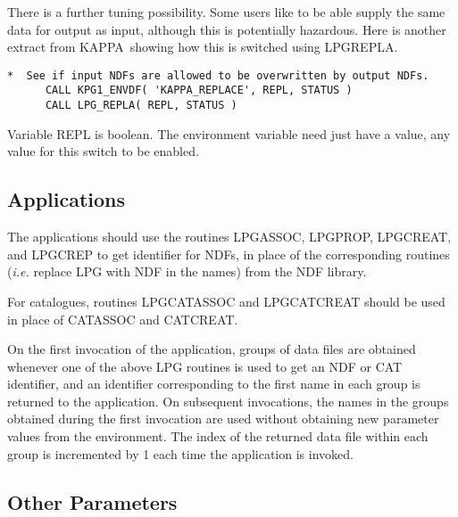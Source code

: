 \documentclass[twoside,11pt]{article}
\newcommand{\htmlref}[2]{#1}
\newcommand{\latex}[1]{#1}
\newcommand{\xref}[3]{#1}
\renewcommand{\_}{\texttt{\symbol{95}}}
\newcommand{\KAPPA}{{\footnotesize KAPPA}\normalsize}
\begin{document}
There is a further tuning possibility.  Some users like to be able
supply the same data for output as input, although this is potentially
hazardous.  Here is another extract from \KAPPA\ showing how this
is switched using \htmlref{LPG\_REPLA}{LPG_REPLA}.

\small
\begin{verbatim}
*  See if input NDFs are allowed to be overwritten by output NDFs.
      CALL KPG1_ENVDF( 'KAPPA_REPLACE', REPL, STATUS )
      CALL LPG_REPLA( REPL, STATUS )
\end{verbatim}
\normalsize
Variable REPL is boolean.  The environment variable need just have a
value, any value for this switch to be enabled.


\subsection{Applications}

The applications should use the routines \htmlref{LPG\_ASSOC}{LPG_ASSOC},
\htmlref{LPG\_PROP}{LPG_PROP}, \htmlref{LPG\_CREAT}{LPG\_CREAT},
and \latex{\linebreak}\htmlref{LPG\_CREP}{LPG_CREP} to get identifier for NDFs, in
place of the corresponding routines (\emph{i.e.} replace LPG with NDF in
the names) from the \xref{NDF library}{sun33}{}.

For catalogues, routines \htmlref{LPG\_CATASSOC}{LPG_CATASSOC} and
\htmlref{LPG\_CATCREAT}{LPG_CATCREAT} should be
used in place of \xref{CAT\_ASSOC}{sun181}{CAT_ASSOC} and
\xref{CAT\_CREAT}{sun181}{CAT_CREAT}.

On the first invocation of the application, groups of data files are
obtained whenever one of the above LPG routines is used to get an NDF
or CAT identifier, and an identifier corresponding to the first name in
each group is returned to the application.  On subsequent invocations,
the names in the groups obtained during the first invocation are used
without obtaining new parameter values from the environment.  The
index of the returned data file within each group is incremented by 1
each time the application is invoked.

\subsection{Other Parameters}
\end{document}
